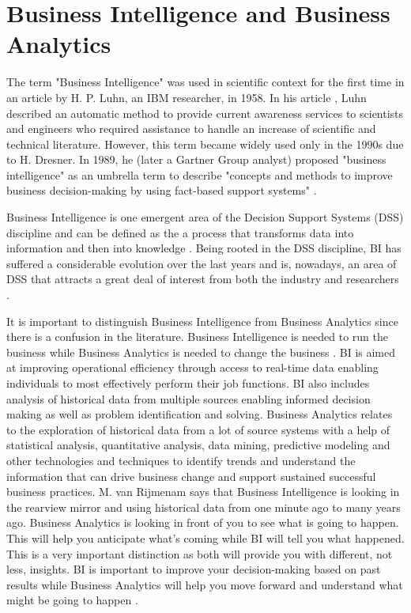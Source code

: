 \documentclass[runningheads]{llncs}
\begin{document}
\section{Business Intelligence and Business Analytics}

The term "Business Intelligence" was used in scientific context for the first time in an article by H. P. Luhn, an IBM researcher, in 1958. In his article \cite{LUHN}, Luhn described an automatic method to provide current awareness services to scientists and engineers who required assistance to handle an increase of scientific and technical literature. However, this term became widely used only in the 1990s due to H. Dresner. In 1989, he (later a Gartner Group analyst) proposed "business intelligence" as an umbrella term to describe "concepts and methods to improve business decision-making by using fact-based support systems" \cite{POWER}. 

Business Intelligence is one emergent area of the Decision Support Systems (DSS) discipline and can be defined as the a process that transforms data into information and then into knowledge \cite{GOLFARELLI}. Being rooted in the DSS discipline, BI has suffered a considerable evolution over the last years and is, nowadays, an area of DSS that attracts a great deal of interest from both the industry and researchers \cite{SHOLLO}.

It is important to distinguish Business Intelligence from Business Analytics since there is a confusion in the literature. Business Intelligence is needed to run the business while Business Analytics is needed to change the business \cite{HEINZE}. BI is aimed at improving operational efficiency through access to real-time data enabling individuals to most effectively perform their job functions. BI also includes analysis of historical data from multiple sources enabling informed decision making as well as problem identification and solving. Business Analytics relates to the exploration of historical data from a lot of source systems with a help of statistical analysis, quantitative analysis, data mining, predictive modeling and other technologies and techniques to identify trends and understand the information that can drive business change and support sustained successful business practices. M. van Rijmenam says that Business Intelligence is looking in the rearview mirror and using historical data from one minute ago to many years ago. Business Analytics is looking in front of you to see what is going to happen. This will help you anticipate what's coming while BI will tell you what happened. This is a very important distinction as both will provide you with different, not less, insights. BI is important to improve your decision-making based on past results while Business Analytics will help you move forward and understand what might be going to happen \cite{HEINZE}.
\end{document}
